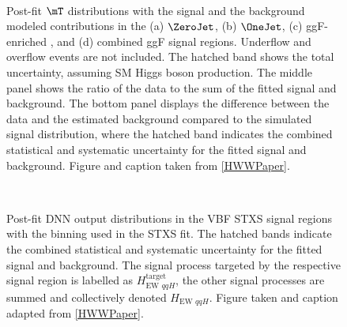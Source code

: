 \begin{figure}[htb]
  \centering
   \\
  \caption{
    Post-fit $\mT$ distributions with the signal and the background modeled contributions
    in the (a) $\ZeroJet$, (b) $\OneJet$, (c) ggF-enriched \TwoJet, and (d) combined ggF signal regions. Underflow and overflow events are not included.
    The hatched band shows the total uncertainty, assuming SM Higgs boson production.
    The middle panel shows the ratio of the data to the sum of the fitted signal and background.
    The bottom panel displays the difference between the data and the estimated background compared to the simulated signal distribution, where the hatched band indicates the combined statistical and systematic uncertainty for the fitted signal and background.
    Figure and caption taken from \cref{HWWPaper}. 
    \label{fig:ggF_MT}
  }
\end{figure}

\begin{figure}[!h]
  \centering
   \\
  \caption{
    Post-fit DNN output distributions in the VBF STXS signal regions with the binning used in the STXS fit.
    The hatched bands indicate the combined statistical and systematic uncertainty for the fitted signal and background.
    The signal process targeted by the respective signal region is labelled as $H_{\text{EW } qqH}^{\mathrm{target}}$, the other signal processes are summed and collectively denoted $H_{\text{EW } qqH}$. 
    Figure taken and caption adapted from \cref{HWWPaper}. 
    \label{fig:aux:VBF-STXS-SRs}
  }
\end{figure}


